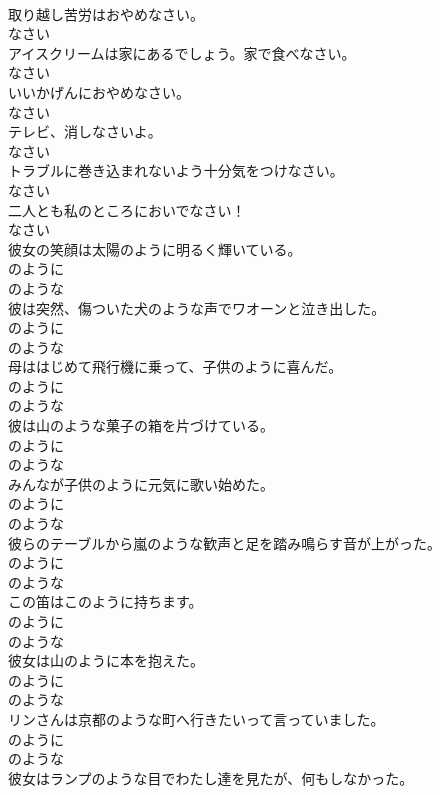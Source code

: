 \documentclass[8pt]{extreport}
\begin{document}
\begin{CJK}{UTF8}{min}
\\	取り越し苦労はおやめなさい。	
\\	なさい
\\	アイスクリームは家にあるでしょう。家で食べなさい。	
\\	なさい
\\	いいかげんにおやめなさい。	
\\	なさい
\\	テレビ、消しなさいよ。	
\\	なさい
\\	トラブルに巻き込まれないよう十分気をつけなさい。	
\\	なさい
\\	二人とも私のところにおいでなさい！	
\\	なさい
\\	彼女の笑顔は太陽のように明るく輝いている。	
\\	のように 
\\	のような
\\	彼は突然、傷ついた犬のような声でワオーンと泣き出した。	
\\	のように 
\\	のような
\\	母ははじめて飛行機に乗って、子供のように喜んだ。	
\\	のように 
\\	のような
\\	彼は山のような菓子の箱を片づけている。	
\\	のように 
\\	のような
\\	みんなが子供のように元気に歌い始めた。	
\\	のように 
\\	のような
\\	彼らのテーブルから嵐のような歓声と足を踏み鳴らす音が上がった。	
\\	のように 
\\	のような
\\	この笛はこのように持ちます。	
\\	のように 
\\	のような
\\	彼女は山のように本を抱えた。	
\\	のように 
\\	のような
\\	リンさんは京都のような町へ行きたいって言っていました。	
\\	のように 
\\	のような
\\	彼女はランプのような目でわたし達を見たが、何もしなかった。	

\end{CJK}
\end{document}
